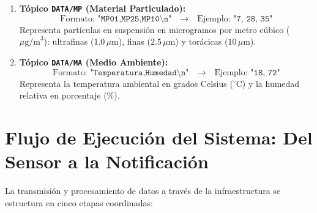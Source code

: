 \documentclass[12pt,letterpaper]{article}
\begin{document}
\begin{enumerate}
    \item \textbf{Tópico \texttt{DATA/MP} (Material Particulado):}
    \begin{equation*}
        \text{Formato: } \texttt{"MP01,MP25,MP10\textbackslash n"} \quad \longrightarrow \quad \text{Ejemplo: } \texttt{"7, 28, 35"}
    \end{equation*}
    Representa partículas en suspensión en microgramos por metro cúbico ($\mu\text{g/m}^3$): ultrafinas ($1.0\,\mu\text{m}$), finas ($2.5\,\mu\text{m}$) y torácicas ($10\,\mu\text{m}$).
    
    \item \textbf{Tópico \texttt{DATA/MA} (Medio Ambiente):}
    \begin{equation*}
        \text{Formato: } \texttt{"Temperatura,Humedad\textbackslash n"} \quad \longrightarrow \quad \text{Ejemplo: } \texttt{"18, 72"}
    \end{equation*}
    Representa la temperatura ambiental en grados Celsius ($^\circ\text{C}$) y la humedad relativa en porcentaje ($\%$).
\end{enumerate}

\section{Flujo de Ejecución del Sistema: Del Sensor a la Notificación}

La transmisión y procesamiento de datos a través de la infraestructura se estructura en cinco etapas coordinadas:
\end{document}

